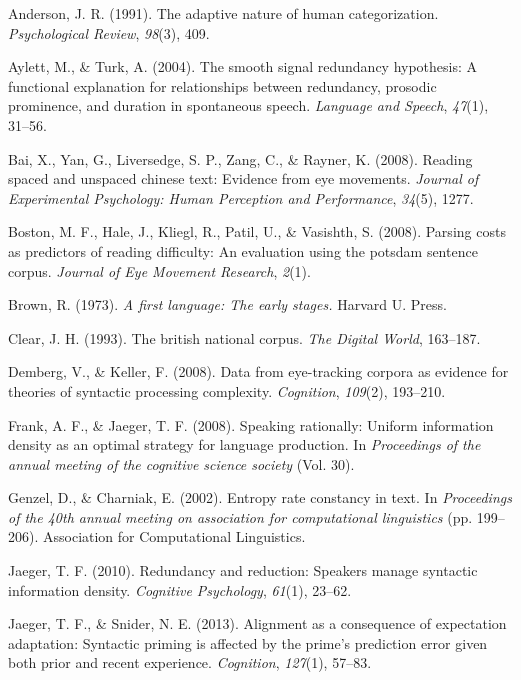\documentclass[10pt, letterpaper]{article}
\begin{document}
\hypertarget{refs}{}
\hypertarget{ref-anderson1991}{}
Anderson, J. R. (1991). The adaptive nature of human categorization.
\emph{Psychological Review}, \emph{98}(3), 409.

\hypertarget{ref-aylett2004}{}
Aylett, M., \& Turk, A. (2004). The smooth signal redundancy hypothesis:
A functional explanation for relationships between redundancy, prosodic
prominence, and duration in spontaneous speech. \emph{Language and
Speech}, \emph{47}(1), 31--56.

\hypertarget{ref-bai2008}{}
Bai, X., Yan, G., Liversedge, S. P., Zang, C., \& Rayner, K. (2008).
Reading spaced and unspaced chinese text: Evidence from eye movements.
\emph{Journal of Experimental Psychology: Human Perception and
Performance}, \emph{34}(5), 1277.

\hypertarget{ref-boston2008}{}
Boston, M. F., Hale, J., Kliegl, R., Patil, U., \& Vasishth, S. (2008).
Parsing costs as predictors of reading difficulty: An evaluation using
the potsdam sentence corpus. \emph{Journal of Eye Movement Research},
\emph{2}(1).

\hypertarget{ref-brown1973}{}
Brown, R. (1973). \emph{A first language: The early stages.} Harvard U.
Press.

\hypertarget{ref-clear1993british}{}
Clear, J. H. (1993). The british national corpus. \emph{The Digital
World}, 163--187.

\hypertarget{ref-demberg2008}{}
Demberg, V., \& Keller, F. (2008). Data from eye-tracking corpora as
evidence for theories of syntactic processing complexity.
\emph{Cognition}, \emph{109}(2), 193--210.

\hypertarget{ref-frank2008speaking}{}
Frank, A. F., \& Jaeger, T. F. (2008). Speaking rationally: Uniform
information density as an optimal strategy for language production. In
\emph{Proceedings of the annual meeting of the cognitive science
society} (Vol. 30).

\hypertarget{ref-genzel2002}{}
Genzel, D., \& Charniak, E. (2002). Entropy rate constancy in text. In
\emph{Proceedings of the 40th annual meeting on association for
computational linguistics} (pp. 199--206). Association for Computational
Linguistics.

\hypertarget{ref-jaeger2010}{}
Jaeger, T. F. (2010). Redundancy and reduction: Speakers manage
syntactic information density. \emph{Cognitive Psychology},
\emph{61}(1), 23--62.

\hypertarget{ref-jaeger2013}{}
Jaeger, T. F., \& Snider, N. E. (2013). Alignment as a consequence of
expectation adaptation: Syntactic priming is affected by the prime's
prediction error given both prior and recent experience.
\emph{Cognition}, \emph{127}(1), 57--83.
\end{document}
